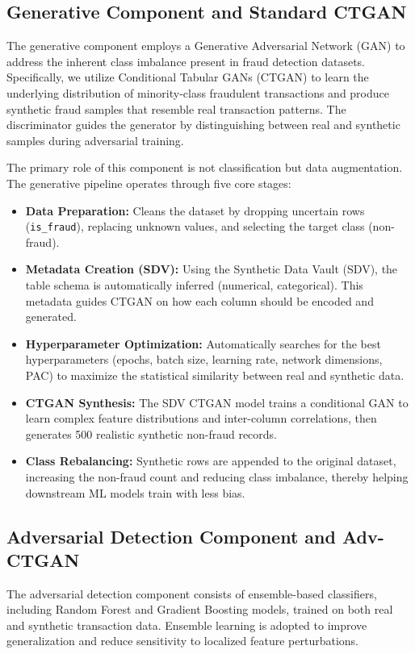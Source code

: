 \documentclass[conference]{IEEEtran}
\begin{document}
\subsection{Generative Component and Standard CTGAN}
The generative component employs a Generative Adversarial Network (GAN) to address the inherent class imbalance present in fraud detection datasets. Specifically, we utilize Conditional Tabular GANs (CTGAN) to learn the underlying distribution of minority-class fraudulent transactions and produce synthetic fraud samples that resemble real transaction patterns. The discriminator guides the generator by distinguishing between real and synthetic samples during adversarial training.

The primary role of this component is not classification but data augmentation. The generative pipeline operates through five core stages:
\begin{itemize}
    \item \textbf{Data Preparation:} Cleans the dataset by dropping uncertain rows (\texttt{is\_fraud}), replacing unknown values, and selecting the target class (non-fraud).
    \item \textbf{Metadata Creation (SDV):} Using the Synthetic Data Vault (SDV), the table schema is automatically inferred (numerical, categorical). This metadata guides CTGAN on how each column should be encoded and generated.
    \item \textbf{Hyperparameter Optimization:} Automatically searches for the best hyperparameters (epochs, batch size, learning rate, network dimensions, PAC) to maximize the statistical similarity between real and synthetic data.
    \item \textbf{CTGAN Synthesis:} The SDV CTGAN model trains a conditional GAN to learn complex feature distributions and inter-column correlations, then generates 500 realistic synthetic non-fraud records.
    \item \textbf{Class Rebalancing:} Synthetic rows are appended to the original dataset, increasing the non-fraud count and reducing class imbalance, thereby helping downstream ML models train with less bias.
\end{itemize}

\subsection{Adversarial Detection Component and Adv-CTGAN}
The adversarial detection component consists of ensemble-based classifiers, including Random Forest and Gradient Boosting models, trained on both real and synthetic transaction data. Ensemble learning is adopted to improve generalization and reduce sensitivity to localized feature perturbations.
\end{document}
